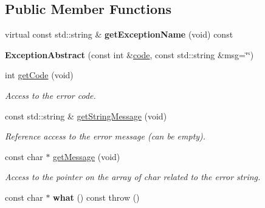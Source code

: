 \subsection*{Public Member Functions}
\begin{DoxyCompactItemize}
\item 
virtual const std\+::string \& {\bfseries get\+Exception\+Name} (void) const \hypertarget{classdynamic__graph_1_1ExceptionAbstract_abb73780d0cdd051bae35776de6ebc47c}{}\label{classdynamic__graph_1_1ExceptionAbstract_abb73780d0cdd051bae35776de6ebc47c}

\item 
{\bfseries Exception\+Abstract} (const int \&\hyperlink{classdynamic__graph_1_1ExceptionAbstract_a160cf3cd35aad75738f8b26c5cec6fdc}{code}, const std\+::string \&msg=\char`\"{}\char`\"{})\hypertarget{classdynamic__graph_1_1ExceptionAbstract_a92d849e378aca22a59aa5294ed9717bb}{}\label{classdynamic__graph_1_1ExceptionAbstract_a92d849e378aca22a59aa5294ed9717bb}

\item 
int \hyperlink{classdynamic__graph_1_1ExceptionAbstract_a4b3009fb1517a2e382026c31ef618526}{get\+Code} (void)
\begin{DoxyCompactList}\small\item\em Access to the error code. \end{DoxyCompactList}\item 
const std\+::string \& \hyperlink{classdynamic__graph_1_1ExceptionAbstract_ab43a64baae9d779737b03c7c1fbb6919}{get\+String\+Message} (void)
\begin{DoxyCompactList}\small\item\em Reference access to the error message (can be empty). \end{DoxyCompactList}\item 
const char $\ast$ \hyperlink{classdynamic__graph_1_1ExceptionAbstract_aa7b63b9c5529a7d07d5a9a880bf9a0a5}{get\+Message} (void)
\begin{DoxyCompactList}\small\item\em Access to the pointer on the array of {\itshape char} related to the error string. \end{DoxyCompactList}\item 
const char $\ast$ {\bfseries what} () const   throw ()\hypertarget{classdynamic__graph_1_1ExceptionAbstract_af9fd492effc5a20e9c7a50bfb1f04e61}{}\label{classdynamic__graph_1_1ExceptionAbstract_af9fd492effc5a20e9c7a50bfb1f04e61}

\end{DoxyCompactItemize}
